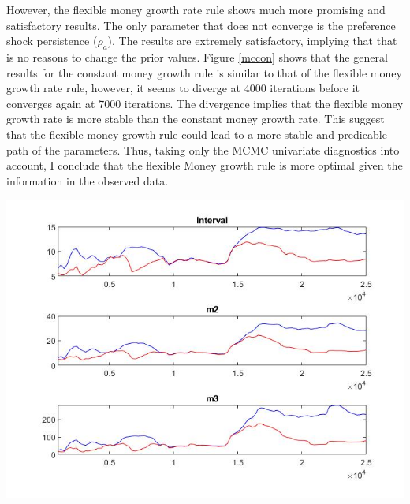 \documentclass[11pt,preprint, authoryear]{elsarticle}
\let\origfigure\figure
\let\endorigfigure\endfigure
\renewenvironment{figure}[1][2] {
    \expandafter\origfigure\expandafter[H]
} {
    \endorigfigure
}
\numberwithin{equation}{section}
\numberwithin{figure}{section}
\numberwithin{table}{section}
\begin{document}
However, the flexible money growth rate rule shows much more promising
and satisfactory results. The only parameter that does not converge is
the preference shock persistence (\(\rho_a\)). The results are extremely
satisfactory, implying that that is no reasons to change the prior
values. Figure \ref{mccon} shows that the general results for the
constant money growth rule is similar to that of the flexible money
growth rate rule, however, it seems to diverge at 4000 iterations before
it converges again at 7000 iterations. The divergence implies that the
flexible money growth rate is more stable than the constant money growth
rate. This suggest that the flexible money growth rule could lead to a
more stable and predicable path of the parameters. Thus, taking only the
MCMC univariate diagnostics into account, I conclude that the flexible
Money growth rule is more optimal given the information in the observed
data.

\begin{figure}
\caption{MCMC general - Taylor Rule}
\centering
\includegraphics[scale=0.5]{mcmctay.jpg}
\label{mcmctay}
\end{figure}
\end{document}

